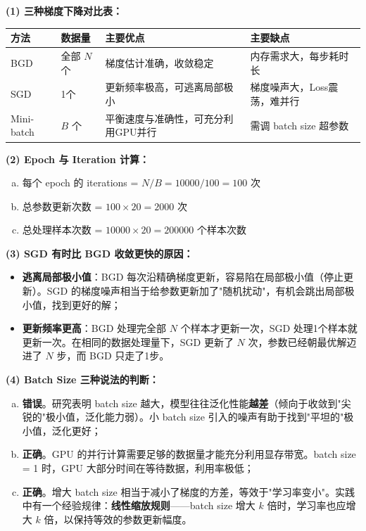 \documentclass[a4paper,11pt]{ctexart}
\begin{document}
\begin{solutionbox}[参考答案与详细解析]
    \textbf{(1) 三种梯度下降对比表：}

    \begin{center}
    \begin{tabular}{p{2.5cm} p{3.0cm} p{3.0cm} p{2.8cm}}
        \toprule
        方法 & 数据量 & 主要优点 & 主要缺点 \\
        \midrule
        BGD & 全部 $N$ 个 & 梯度估计准确，收敛稳定 & 内存需求大，每步耗时长 \\[0.8em]
        SGD & 1个 & 更新频率极高，可逃离局部极小 & 梯度噪声大，Loss震荡，难并行 \\[0.8em]
        Mini-batch & $B$ 个 & 平衡速度与准确性，可充分利用GPU并行 & 需调 batch size 超参数 \\
        \bottomrule
    \end{tabular}
    \end{center}

    \textbf{(2) Epoch 与 Iteration 计算：}

    \begin{enumerate}[a.]
        \item 每个 epoch 的 iterations = $N / B = 10000 / 100 = \boxed{100}$ 次
        \item 总参数更新次数 = $100 \times 20 = \boxed{2000}$ 次
        \item 总处理样本次数 = $10000 \times 20 = \boxed{200000}$ 个样本次数
    \end{enumerate}

    \textbf{(3) SGD 有时比 BGD 收敛更快的原因：}

    \begin{itemize}
        \item \textbf{逃离局部极小值}：BGD 每次沿精确梯度更新，容易陷在局部极小值（停止更新）。SGD 的梯度噪声相当于给参数更新加了"随机扰动"，有机会跳出局部极小值，找到更好的解；
        \item \textbf{更新频率更高}：BGD 处理完全部 $N$ 个样本才更新一次，SGD 处理1个样本就更新一次。在相同的数据处理量下，SGD 更新了 $N$ 次，参数已经朝最优解迈进了 $N$ 步，而 BGD 只走了1步。
    \end{itemize}

    \textbf{(4) Batch Size 三种说法的判断：}

    \begin{enumerate}[a.]
        \item \textbf{错误}。研究表明 batch size 越大，模型往往泛化性能\textbf{越差}（倾向于收敛到"尖锐的"极小值，泛化能力弱）。小 batch size 引入的噪声有助于找到"平坦的"极小值，泛化更好；
        \item \textbf{正确}。GPU 的并行计算需要足够的数据量才能充分利用显存带宽。batch size = 1 时，GPU 大部分时间在等待数据，利用率极低；
        \item \textbf{正确}。增大 batch size 相当于减小了梯度的方差，等效于"学习率变小"。实践中有一个经验规律：\textbf{线性缩放规则}——batch size 增大 $k$ 倍时，学习率也应增大 $k$ 倍，以保持等效的参数更新幅度。
    \end{enumerate}


\end{solutionbox}
\end{document}
